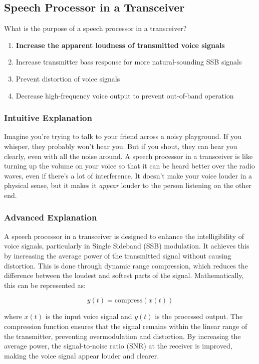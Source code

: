 \subsection{Speech Processor in a Transceiver}
\label{G4D01}

\begin{tcolorbox}[colback=gray!10!white,colframe=black!75!black,title=G4D01]
What is the purpose of a speech processor in a transceiver?
\begin{enumerate}[label=\Alph*)]
    \item \textbf{Increase the apparent loudness of transmitted voice signals}
    \item Increase transmitter bass response for more natural-sounding SSB signals
    \item Prevent distortion of voice signals
    \item Decrease high-frequency voice output to prevent out-of-band operation
\end{enumerate}
\end{tcolorbox}

\subsubsection{Intuitive Explanation}
Imagine you're trying to talk to your friend across a noisy playground. If you whisper, they probably won't hear you. But if you shout, they can hear you clearly, even with all the noise around. A speech processor in a transceiver is like turning up the volume on your voice so that it can be heard better over the radio waves, even if there's a lot of interference. It doesn't make your voice louder in a physical sense, but it makes it \textit{appear} louder to the person listening on the other end.

\subsubsection{Advanced Explanation}
A speech processor in a transceiver is designed to enhance the intelligibility of voice signals, particularly in Single Sideband (SSB) modulation. It achieves this by increasing the average power of the transmitted signal without causing distortion. This is done through dynamic range compression, which reduces the difference between the loudest and softest parts of the signal. Mathematically, this can be represented as:

\[
y(t) = \text{compress}(x(t))
\]

where \( x(t) \) is the input voice signal and \( y(t) \) is the processed output. The compression function ensures that the signal remains within the linear range of the transmitter, preventing overmodulation and distortion. By increasing the average power, the signal-to-noise ratio (SNR) at the receiver is improved, making the voice signal appear louder and clearer.

